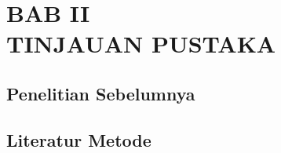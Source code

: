 \chapter*{BAB II\\TINJAUAN PUSTAKA}

\section{Penelitian Sebelumnya}
\blindtext
\section{Literatur Metode}